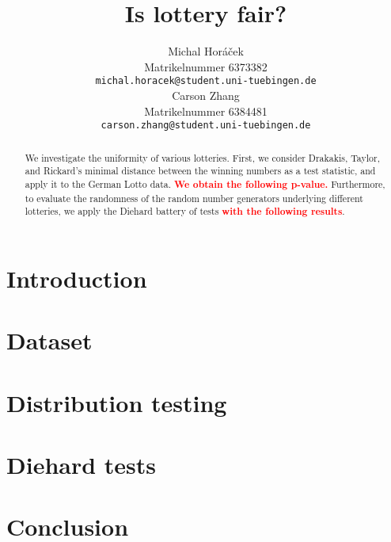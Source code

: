 \documentclass{article}
\title{Is lottery fair?}
\author{%
  Michal Horáček\\
  Matrikelnummer 6373382\\
  \texttt{michal.horacek@student.uni-tuebingen.de} \\
  \And
  Carson Zhang\\
  Matrikelnummer 6384481\\
  \texttt{carson.zhang@student.uni-tuebingen.de} \\
}
\newcommand{\todo}[1]{\textcolor{red}{\textbf{#1}}}
\begin{document}
\maketitle

\begin{abstract}
    We investigate the uniformity of various lotteries. 
    First, we consider Drakakis, Taylor, and Rickard's minimal distance between the winning numbers
    as a test statistic, and apply it to the German Lotto data. \todo{We obtain the following p-value.}
    Furthermore, to evaluate the randomness of the random number generators underlying different lotteries,
    we apply the Diehard battery of tests \todo{with the following results}.
\end{abstract}

\section{Introduction}
\label{sec:introduction}


\section{Dataset}
\label{sec:dataset}


\section{Distribution testing}
\label{sec:methods}


\section{Diehard tests}
\label{sec:diehard}


\section{Conclusion}
\label{sec:conclusion}




\end{document}

